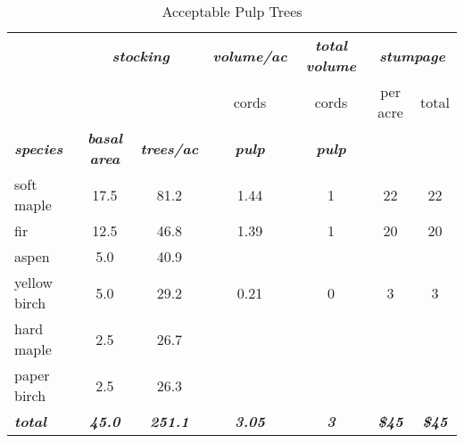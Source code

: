 \documentclass[landscape]{article}
\begin{document}
\begin{table}[H]

\caption{\label{tab:unnamed-chunk-28}Acceptable Pulp Trees}
\fontsize{10}{12}\selectfont
\begin{tabular}[t]{lcccccc}
\toprule
\multicolumn{1}{c}{\em{\textbf{ }}} & \multicolumn{2}{c}{\em{\textbf{stocking}}} & \multicolumn{1}{c}{\em{\textbf{volume/ac }}} & \multicolumn{1}{c}{\em{\textbf{total volume}}} & \multicolumn{2}{c}{\em{\textbf{stumpage}}} \\
\cmidrule(l{3pt}r{3pt}){2-3} \cmidrule(l{3pt}r{3pt}){4-4} \cmidrule(l{3pt}r{3pt}){5-5} \cmidrule(l{3pt}r{3pt}){6-7}
\multicolumn{3}{c}{ } & \multicolumn{1}{c}{cords} & \multicolumn{1}{c}{cords} & \multicolumn{1}{c}{per acre} & \multicolumn{1}{c}{total} \\
\cmidrule(l{3pt}r{3pt}){4-4} \cmidrule(l{3pt}r{3pt}){5-5} \cmidrule(l{3pt}r{3pt}){6-6} \cmidrule(l{3pt}r{3pt}){7-7}
\rowcolor[HTML]{DCDCDC}  \em{\textbf{species}} & \em{\textbf{basal area}} & \em{\textbf{trees/ac}} & \em{\textbf{pulp}} & \em{\textbf{pulp}} & \em{\textbf{ }} & \em{\textbf{ }}\\
\midrule
\rowcolor{gray!6}  soft maple & 17.5 & 81.2 & 1.44 & 1 & 22 & 22\\
 
fir & 12.5 & 46.8 & 1.39 & 1 & 20 & 20\\
 
\rowcolor{gray!6}  aspen & 5.0 & 40.9 &  &  &  & \\
 
yellow birch & 5.0 & 29.2 & 0.21 & 0 & 3 & 3\\
 
\rowcolor{gray!6}  hard maple & 2.5 & 26.7 &  &  &  & \\
 
paper birch & 2.5 & 26.3 &  &  &  & \\
 
\rowcolor{gray!6}  \rowcolor[HTML]{DCDCDC}  \em{\textbf{total}} & \em{\textbf{45.0}} & \em{\textbf{251.1}} & \em{\textbf{3.05}} & \em{\textbf{3}} & \em{\textbf{\$45}} & \em{\textbf{\$45}}\\
\bottomrule
\end{tabular}
\end{table}
\end{document}
